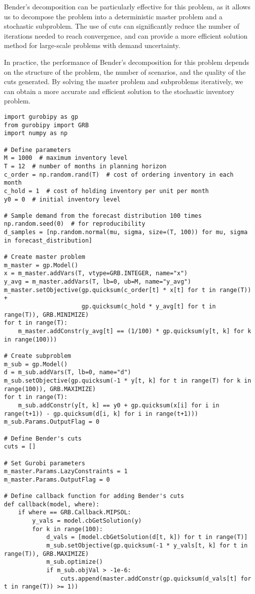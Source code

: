 Bender's decomposition can be particularly effective for this problem, as it allows us to decompose the problem into a deterministic master problem and a stochastic subproblem. The use of cuts can significantly reduce the number of iterations needed to reach convergence, and can provide a more efficient solution method for large-scale problems with demand uncertainty.

In practice, the performance of Bender's decomposition for this problem depends on the structure of the problem, the number of scenarios, and the quality of the cuts generated. By solving the master problem and subproblems iteratively, we can obtain a more accurate and efficient solution to the stochastic inventory problem.


\begin{verbatim}
import gurobipy as gp
from gurobipy import GRB
import numpy as np

# Define parameters
M = 1000  # maximum inventory level
T = 12  # number of months in planning horizon
c_order = np.random.rand(T)  # cost of ordering inventory in each month
c_hold = 1  # cost of holding inventory per unit per month
y0 = 0  # initial inventory level

# Sample demand from the forecast distribution 100 times
np.random.seed(0)  # for reproducibility
d_samples = [np.random.normal(mu, sigma, size=(T, 100)) for mu, sigma in forecast_distribution]

# Create master problem
m_master = gp.Model()
x = m_master.addVars(T, vtype=GRB.INTEGER, name="x")
y_avg = m_master.addVars(T, lb=0, ub=M, name="y_avg")
m_master.setObjective(gp.quicksum(c_order[t] * x[t] for t in range(T)) +
                      gp.quicksum(c_hold * y_avg[t] for t in range(T)), GRB.MINIMIZE)
for t in range(T):
    m_master.addConstr(y_avg[t] == (1/100) * gp.quicksum(y[t, k] for k in range(100)))

# Create subproblem
m_sub = gp.Model()
d = m_sub.addVars(T, lb=0, name="d")
m_sub.setObjective(gp.quicksum(-1 * y[t, k] for t in range(T) for k in range(100)), GRB.MAXIMIZE)
for t in range(T):
    m_sub.addConstr(y[t, k] == y0 + gp.quicksum(x[i] for i in range(t+1)) - gp.quicksum(d[i, k] for i in range(t+1)))
m_sub.Params.OutputFlag = 0

# Define Bender's cuts
cuts = []

# Set Gurobi parameters
m_master.Params.LazyConstraints = 1
m_master.Params.OutputFlag = 0

# Define callback function for adding Bender's cuts
def callback(model, where):
    if where == GRB.Callback.MIPSOL:
        y_vals = model.cbGetSolution(y)
        for k in range(100):
            d_vals = [model.cbGetSolution(d[t, k]) for t in range(T)]
            m_sub.setObjective(gp.quicksum(-1 * y_vals[t, k] for t in range(T)), GRB.MAXIMIZE)
            m_sub.optimize()
            if m_sub.objVal > -1e-6:
                cuts.append(master.addConstr(gp.quicksum(d_vals[t] for t in range(T)) >= 1))


\end{verbatim}
